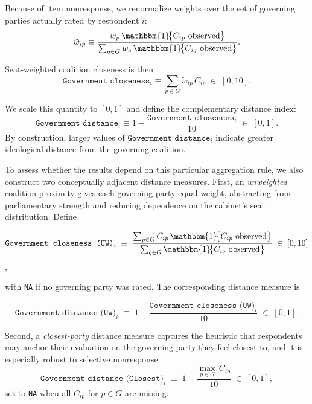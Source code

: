 \documentclass[11pt]{article}\usepackage[]{graphicx}\usepackage[]{xcolor}
\begin{document}
Because of item nonresponse, we renormalize weights over the set of governing parties actually rated by respondent $i$:
\begin{equation}
\tilde w_{ip} \equiv
\frac{w_p \,\mathbbm{1}\!\bigl\{\text{$C_{ip}$ observed}\bigr\}}
{\sum_{q \in G} w_q \,\mathbbm{1}\!\bigl\{\text{$C_{iq}$ observed}\bigr\}}.
\label{eq:renorm}
\end{equation}

Seat-weighted coalition closeness is then
\begin{equation}
{\texttt{Government closeness}}_i \equiv \sum_{p \in G} \tilde w_{ip}\, C_{ip} \;\in\; [0,10].
\label{eq:govclose}
\end{equation}

We scale this quantity to $[0,1]$ and define the complementary distance index:
\begin{equation}
{\texttt{Government distance}}_i \equiv 1 - \frac{{\texttt{Government closeness}}_i}{10}
\;\in\; [0,1].
\label{eq:govdist}
\end{equation}
By construction, larger values of ${\texttt{Government distance}}_i$ indicate greater ideological distance from the governing coalition.

To assess whether the results depend on this particular aggregation rule, we also construct two conceptually adjacent distance measures. First, an \emph{unweighted} coalition proximity gives each governing party equal weight, abstracting from parliamentary strength and reducing dependence on the cabinet's seat distribution. Define


\begin{equation}
\texttt{Government closeness (UW)}_i \;\equiv\;
\frac{\sum_{p\in G} C_{ip}\,\mathbbm{1}\!\bigl\{\text{$C_{ip}$ observed}\bigr\}}
     {\sum_{q\in G} \mathbbm{1}\!\bigl\{\text{$C_{iq}$ observed}\bigr\}}
\;\in\;[0,10]
\label{eq:govclose_u}
\end{equation},


with \texttt{NA} if no governing party was rated. The corresponding distance measure is

\begin{equation}
\texttt{Government distance (UW)}_i \;\equiv\;
1 - \frac{\texttt{Government closeness (UW)}_i}{10}
\;\in\;[0,1].
\label{eq:govdist_u}
\end{equation}

Second, a \emph{closest-party} distance measure captures the heuristic that respondents may anchor their evaluation on the governing party they feel closest to, and it is especially robust to selective nonresponse:
\begin{equation}
\texttt{Government distance (Closest)}_i \;\equiv\;
1 - \frac{\max_{p\in G}\, C_{ip}}{10}
\;\in\;[0,1],
\label{eq:govdist_min}
\end{equation}
set to \texttt{NA} when all $C_{ip}$ for $p\in G$ are missing.
\end{document}
